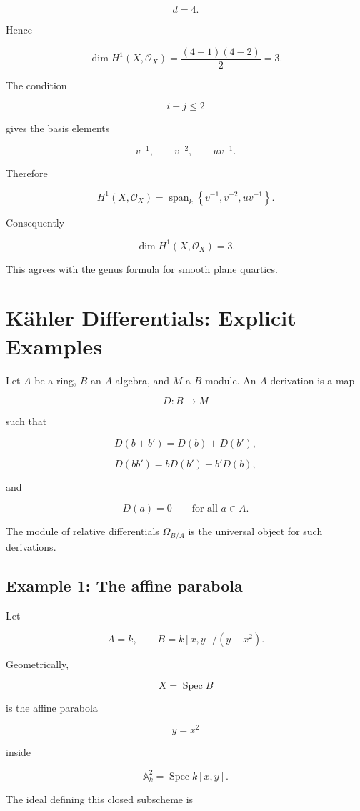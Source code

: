 \documentclass[12pt,a4paper]{article}
\theoremstyle{notespace}
\begin{document}
\[
d=4.
\]

Hence

\[
\dim H^1(X,\mathcal O_X)
=
\frac{(4-1)(4-2)}2
=
3.
\]

The condition

\[
i+j\le 2
\]

gives the basis elements

\[
v^{-1},
\qquad
v^{-2},
\qquad
uv^{-1}.
\]

Therefore

\[
H^1(X,\mathcal O_X)
=
\operatorname{span}_k
\left\{
v^{-1},
v^{-2},
uv^{-1}
\right\}.
\]

Consequently

\[
\boxed{
	\dim H^1(X,\mathcal O_X)=3.
}
\]

This agrees with the genus formula for smooth plane quartics.

\section{Kähler Differentials: Explicit Examples}

Let \(A\) be a ring, \(B\) an \(A\)-algebra, and \(M\) a \(B\)-module. An \(A\)-derivation is a map

\[
D:B\to M
\]

such that

\[
D(b+b')=D(b)+D(b'),
\]

\[
D(bb')=bD(b')+b'D(b),
\]

and

\[
D(a)=0
\qquad
\text{for all }a\in A.
\]

The module of relative differentials \(\Omega_{B/A}\) is the universal object for such derivations.

\subsection{Example 1: The affine parabola}

Let

\[
A=k,
\qquad
B=k[x,y]/(y-x^2).
\]

Geometrically,

\[
X=\operatorname{Spec}B
\]

is the affine parabola

\[
y=x^2
\]

inside

\[
\mathbb A^2_k=\operatorname{Spec}k[x,y].
\]

The ideal defining this closed subscheme is
\end{document}
